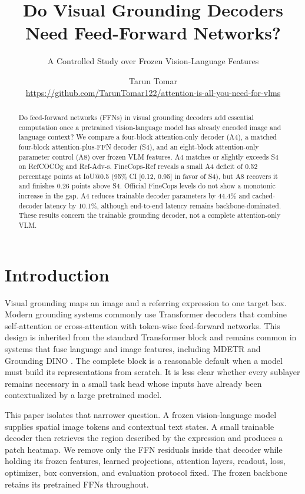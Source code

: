 \documentclass[10pt]{article}
\title{Do Visual Grounding Decoders Need Feed-Forward Networks?}
\subtitle{A Controlled Study over Frozen Vision-Language Features}
\author{Tarun Tomar\\\small\url{https://github.com/TarunTomar122/attention-is-all-you-need-for-vlms}}
\date{}
\begin{document}
\maketitle

\begin{abstract}
Do feed-forward networks (FFNs) in visual grounding decoders add essential
computation once a pretrained vision-language model has already encoded image
and language context? We compare a four-block attention-only decoder (A4), a
matched four-block attention-plus-FFN decoder (S4), and an eight-block
attention-only parameter control (A8) over frozen VLM features. A4 matches or
slightly exceeds S4 on RefCOCOg and Ref-Adv-s. FineCops-Ref reveals a small A4
deficit of 0.52 percentage points at IoU@0.5 (95\% CI [0.12, 0.95] in favor of
S4), but A8 recovers it and finishes 0.26 points above S4. Official FineCops
levels do not show a monotonic increase in the gap. A4 reduces trainable
decoder parameters by 44.4\% and cached-decoder latency by 10.1\%, although
end-to-end latency remains backbone-dominated. These results concern the
trainable grounding decoder, not a complete attention-only VLM.
\end{abstract}

\section{Introduction}\label{introduction}

Visual grounding maps an image and a referring expression to one target box.
Modern grounding systems commonly use Transformer decoders that combine
self-attention or cross-attention with token-wise feed-forward networks. This
design is inherited from the standard Transformer block and remains common in
systems that fuse language and image features, including MDETR and Grounding
DINO \citep{kamath2021mdetr,liu2024groundingdino}. The complete block is a
reasonable default when a model must build its representations from scratch.
It is less clear whether every sublayer remains necessary in a small task head
whose inputs have already been contextualized by a large pretrained model.

This paper isolates that narrower question. A frozen vision-language model
supplies spatial image tokens and contextual text states. A small trainable
decoder then retrieves the region described by the expression and produces a
patch heatmap. We remove only the FFN residuals inside that decoder while
holding its frozen features, learned projections, attention layers, readout,
loss, optimizer, box conversion, and evaluation protocol fixed. The frozen
backbone retains its pretrained FFNs throughout.
\end{document}
